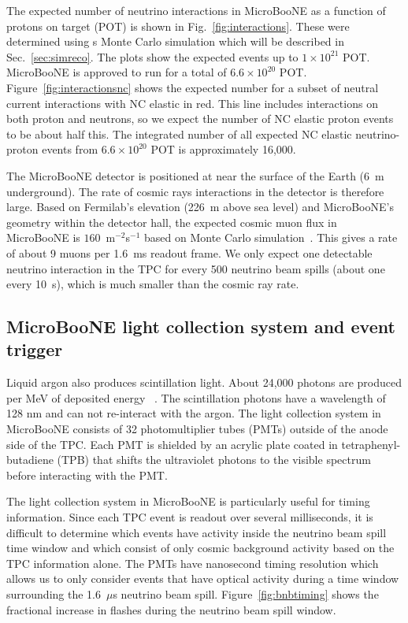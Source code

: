   The expected number of neutrino interactions in MicroBooNE as a function of
  protons on target (POT) is shown in Fig.~\ref{fig:interactions}. These were
  determined using s Monte Carlo simulation which will be described in
  Sec.~\ref{sec:simreco}. The plots show the expected events up to $1\times
  10^{21}$ POT. MicroBooNE is approved to run for a total of $6.6\times
  10^{20}$ POT. Figure~\ref{fig:interactionsnc} shows the expected number for
  a subset of neutral current interactions with NC elastic in red. This line
  includes interactions on both proton and neutrons, so we expect the number
  of NC elastic proton events to be about half this. The integrated number of
  all expected NC elastic neutrino-proton events from $6.6\times 10^{20}$ POT
  is approximately 16,000.

  The MicroBooNE detector is positioned at near the surface of the Earth (6~m
  underground). The rate of cosmic rays interactions in the detector is
  therefore large. Based on Fermilab's elevation (226~m above sea level) and
  MicroBooNE's geometry within the detector hall, the expected cosmic muon
  flux in MicroBooNE is $160$~m$^{-2}$s$^{-1}$ based on Monte Carlo
  simulation~\cite{cosmicnote}. This gives a rate of about 9 muons per 1.6~ms
  readout frame. We only expect one detectable neutrino interaction in the
  TPC for every 500 neutrino beam spills (about one every 10~s), which is
  much smaller than the cosmic ray rate.

\subsection{MicroBooNE light collection system and event trigger}\label{sec:swtrigger}
  Liquid argon also produces scintillation light. About 24,000 photons are
  produced per MeV of deposited energy ~\cite{detectorpaper}. The
  scintillation photons have a wavelength of 128 nm and can not re-interact
  with the argon. The light collection system in MicroBooNE consists of
  32 photomultiplier tubes (PMTs) outside of the anode side of the
  TPC. Each PMT is shielded by an acrylic plate coated in
  tetraphenyl-butadiene (TPB) that shifts the ultraviolet photons to the
  visible spectrum before interacting with the PMT.

  The light collection system in MicroBooNE is particularly useful for timing
  information. Since each TPC event is readout over several milliseconds, it
  is difficult to determine which events have activity inside the neutrino
  beam spill time window and which consist of only cosmic background activity
  based on the TPC information alone. The PMTs have nanosecond timing
  resolution which allows us to only consider events that have optical
  activity during a time window surrounding the 1.6~$\mu$s neutrino beam
  spill. Figure~\ref{fig:bnbtiming} shows the fractional increase in flashes
  during the neutrino beam spill window.

